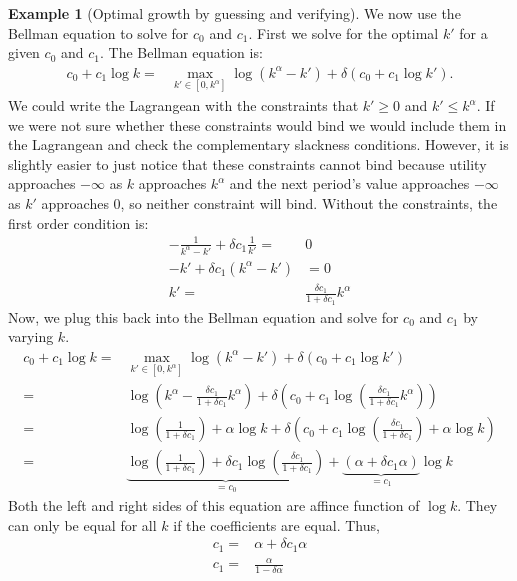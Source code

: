 \documentclass[12pt,reqno]{amsart}
\theoremstyle{definition}
\newtheorem{example}{Example}[section]
\begin{document}
\begin{example}[Optimal growth by guessing and verifying]
 We now use the Bellman equation to solve for $c_0$ and $c_1$. First
 we solve for the optimal $k'$ for a given $c_0$ and $c_1$. The
 Bellman equation is:
 \begin{align*}
   c_0 + c_1 \log k = & \max_{k' \in [0,k^\alpha]} \log(k^\alpha-k') +
   \delta\left(c_0 + c_1 \log k' \right).
 \end{align*}   
 We could write the Lagrangean with the constraints that $k'\geq 0$
 and $k'\leq k^\alpha$. If we were not sure whether these constraints
 would bind we would include them in the Lagrangean and check the
 complementary slackness conditions. However, it is slightly easier to
 just notice that these constraints cannot bind because utility
 approaches $-\infty$ as $k$ approaches $k^\alpha$ and the next
 period's value approaches $-\infty$ as $k'$ approaches $0$, so
 neither constraint will bind.  Without the constraints, the first
 order condition is:
 \begin{align*}
   -\frac{1}{k^\alpha - k'}  + \delta c_1 \frac{1}{k'} = & 0 \\
   -k' + \delta c_1 (k^\alpha - k') & = 0 \\
   k' = & \frac{\delta c_1}{1+\delta c_1} k^\alpha
 \end{align*}
 Now, we plug this back into the Bellman equation and solve for $c_0$
 and $c_1$ by varying $k$. 
 \begin{align*}
   c_0 + c_1 \log k = & \max_{k' \in [0,k^\alpha]} \log(k^\alpha-k') +
   \delta\left(c_0 + c_1 \log k' \right) \\
   = & \log\left(k^\alpha - \frac{\delta c_1}{1+\delta c_1}
     k^\alpha\right) + \delta \left(c_0 + c_1 \log \left(\frac{\delta
         c_1}{1+\delta c_1} k^\alpha\right) \right) \\
   = & \log\left(\frac{1}{1+\delta c_1}\right) + \alpha \log k +
   \delta\left(c_0 + c_1 \log\left(\frac{\delta
         c_1}{1+\delta c_1} \right) + \alpha \log k \right) \\
   = & \underbrace{\log\left(\frac{1}{1+\delta c_1}\right) + \delta
     c_1 \log\left(\frac{\delta c_1}{1+\delta c_1} \right)}_{=c_0} +
   \underbrace{(\alpha + \delta c_1 \alpha )}_{= c_1} \log k
 \end{align*}
 Both the left and right sides of this equation are affince function
 of $\log k$. They can only be equal for all $k$ if the coefficients
 are equal. Thus,
 \begin{align*} 
   c_1 = & \alpha + \delta c_1 \alpha \\
   c_1 = & \frac{\alpha}{1-\delta \alpha}

\end{align*}
\end{example}
\end{document}
